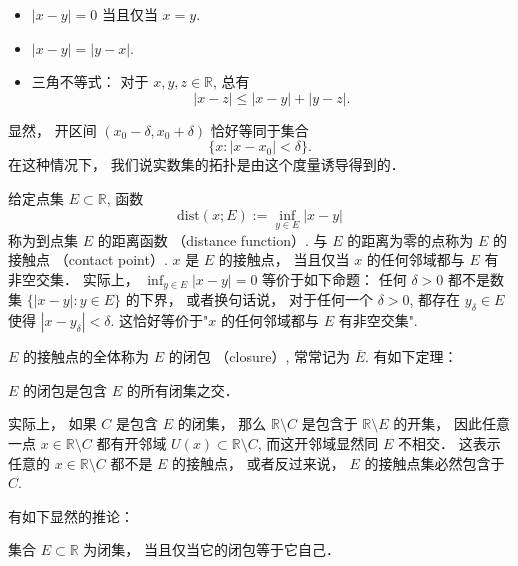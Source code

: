 \begin{itemize}
\item $|x-y|=0$ 当且仅当 $x=y$.
\item $|x-y|=|y-x|$.
\item 三角不等式： 对于 $x,y,z\in\mathbb{R}$, 总有
$$
|x-z|\leq|x-y|+|y-z|.
$$
\end{itemize}

显然， 开区间 $(x_0-\delta,x_0+\delta)$ 恰好等同于集合
$$
\{x:|x-x_0|<\delta\}.
$$
在这种情况下， 我们说实数集的拓扑是由这个度量诱导得到的．

给定点集 $E\subset\mathbb{R}$, 函数
$$
\text{dist}(x;E):=\inf_{y\in E}|x-y|
$$
称为到点集 $E$ 的距离函数 （distance function）. 与 $E$ 的距离为零的点称为 $E$ 的接触点 （contact point）. $x$ 是 $E$ 的接触点， 当且仅当 $x$ 的任何邻域都与 $E$ 有非空交集． 实际上， $\inf_{y\in E}|x-y|=0$ 等价于如下命题： 任何 $\delta>0$ 都不是数集 $\{|x-y|:y\in E\}$ 的下界， 或者换句话说， 对于任何一个 $\delta>0$, 都存在 $y_\delta\in E$ 使得 $|x-y_\delta|<\delta$. 这恰好等价于"$x$ 的任何邻域都与 $E$ 有非空交集".

$E$ 的接触点的全体称为 $E$ 的闭包 （closure）, 常常记为 $\bar E$. 有如下定理：
\begin{theorem}{}
$E$ 的闭包是包含 $E$ 的所有闭集之交．
\end{theorem}
实际上， 如果 $C$ 是包含 $E$ 的闭集， 那么 $\mathbb{R}\setminus C$ 是包含于 $\mathbb{R}\setminus E$ 的开集， 因此任意一点 $x\in\mathbb{R}\setminus C$ 都有开邻域 $U(x)\subset\mathbb{R}\setminus C$, 而这开邻域显然同 $E$ 不相交． 这表示任意的 $x\in\mathbb{R}\setminus C$ 都不是 $E$ 的接触点， 或者反过来说， $E$ 的接触点集必然包含于 $C$. 

有如下显然的推论：
\begin{corollary}{}
集合 $E\subset\mathbb{R}$ 为闭集， 当且仅当它的闭包等于它自己．
\end{corollary}